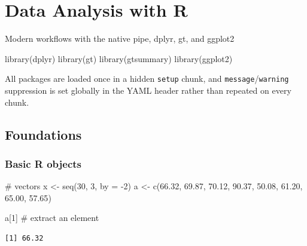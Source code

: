\documentclass[
  letterpaper,
  DIV=11,
  numbers=noendperiod]{scrreprt}
\newenvironment{Shaded}{\begin{snugshade}}{\end{snugshade}}
\newcommand{\AttributeTok}[1]{\textcolor[rgb]{0.40,0.45,0.13}{#1}}
\newcommand{\CommentTok}[1]{\textcolor[rgb]{0.37,0.37,0.37}{#1}}
\newcommand{\DecValTok}[1]{\textcolor[rgb]{0.68,0.00,0.00}{#1}}
\newcommand{\FloatTok}[1]{\textcolor[rgb]{0.68,0.00,0.00}{#1}}
\newcommand{\FunctionTok}[1]{\textcolor[rgb]{0.28,0.35,0.67}{#1}}
\newcommand{\NormalTok}[1]{\textcolor[rgb]{0.00,0.23,0.31}{#1}}
\newcommand{\OtherTok}[1]{\textcolor[rgb]{0.00,0.23,0.31}{#1}}
\newcommand{\SpecialCharTok}[1]{\textcolor[rgb]{0.37,0.37,0.37}{#1}}
\renewcommand{\[}{\begin{equation}}
\renewcommand{\]}{\end{equation}}
\begin{document}

\chapter{Data Analysis with R}\label{data-analysis-with-r}

Modern workflows with the native pipe, dplyr, gt, and ggplot2

\hfill\break

\begin{Shaded}
\begin{Highlighting}[]
\FunctionTok{library}\NormalTok{(dplyr)}
\FunctionTok{library}\NormalTok{(gt)}
\FunctionTok{library}\NormalTok{(gtsummary)}
\FunctionTok{library}\NormalTok{(ggplot2)}
\end{Highlighting}
\end{Shaded}

All packages are loaded once in a hidden \texttt{setup} chunk, and
\texttt{message}/\texttt{warning} suppression is set globally in the
YAML header rather than repeated on every chunk.

\section{Foundations}\label{foundations}

\subsection{Basic R objects}\label{basic-r-objects}

\begin{Shaded}
\begin{Highlighting}[]
\CommentTok{\# vectors}
\NormalTok{x }\OtherTok{\textless{}{-}} \FunctionTok{seq}\NormalTok{(}\DecValTok{30}\NormalTok{, }\DecValTok{3}\NormalTok{, }\AttributeTok{by =} \SpecialCharTok{{-}}\DecValTok{2}\NormalTok{)}
\NormalTok{a }\OtherTok{\textless{}{-}} \FunctionTok{c}\NormalTok{(}\FloatTok{66.32}\NormalTok{, }\FloatTok{69.87}\NormalTok{, }\FloatTok{70.12}\NormalTok{, }\FloatTok{90.37}\NormalTok{, }\FloatTok{50.08}\NormalTok{, }\FloatTok{61.20}\NormalTok{, }\FloatTok{65.00}\NormalTok{, }\FloatTok{57.65}\NormalTok{)}

\NormalTok{a[}\DecValTok{1}\NormalTok{]            }\CommentTok{\# extract an element}
\end{Highlighting}
\end{Shaded}

\begin{verbatim}
[1] 66.32
\end{verbatim}
\end{document}
